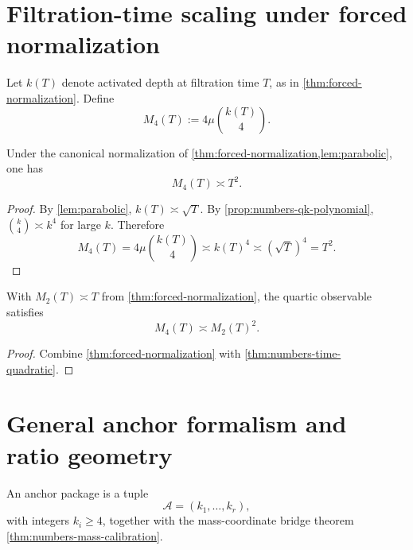 \section{Filtration-time scaling under forced normalization}
\label{sec:numbers-time-scaling}

\begin{definition}
\label{def:numbers-time-lifted}
Let \(k(T)\) denote activated depth at filtration time \(T\), as in
\cref{thm:forced-normalization}.
Define
\[
  M_4(T):=4\mu\binom{k(T)}{4}.
\]
\end{definition}

\begin{theorem}
\label{thm:numbers-time-quadratic}
Under the canonical normalization of
\cref{thm:forced-normalization,lem:parabolic}, one has
\[
  M_4(T)\asymp T^2.
\]
\end{theorem}

\begin{proof}
By \cref{lem:parabolic},
\(
  k(T)\asymp\sqrt T
\).
By \cref{prop:numbers-qk-polynomial},
\(
  \binom{k}{4}\asymp k^4
\)
for large \(k\).
Therefore
\[
  M_4(T)
  =4\mu\binom{k(T)}{4}
  \asymp
  k(T)^4
  \asymp
  (\sqrt T)^4
  =T^2.
\]
\end{proof}

\begin{corollary}
\label{cor:numbers-visible-scale-separation}
With
\(
  M_2(T)\asymp T
\)
from \cref{thm:forced-normalization}, the quartic observable satisfies
\[
  M_4(T)\asymp M_2(T)^2.
\]
\end{corollary}

\begin{proof}
Combine \cref{thm:forced-normalization} with
\cref{thm:numbers-time-quadratic}.
\end{proof}

\section{General anchor formalism and ratio geometry}
\label{sec:numbers-anchor-geometry}

\begin{definition}
\label{def:numbers-anchor-package}
An anchor package is a tuple
\[
  \mathcal A=(k_1,\dots,k_r),
\]
with integers \(k_i\ge4\), together with the mass-coordinate
bridge theorem \cref{thm:numbers-mass-calibration}.
\end{definition}

